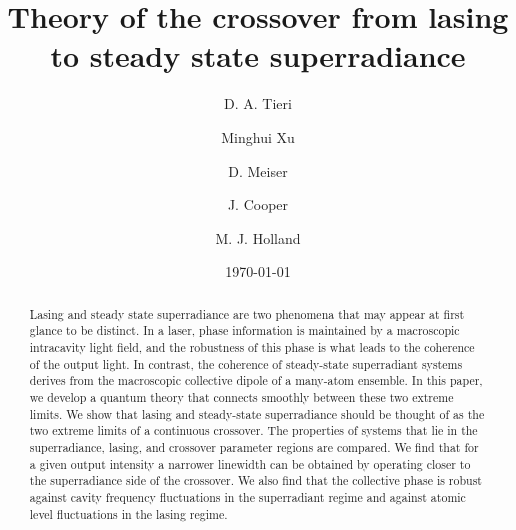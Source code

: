 \documentclass[aps,
twocolumn,
showpacs,
superscriptaddress,groupedaddress]{revtex4}
\begin{document}
\title{Theory of the crossover from lasing to steady state superradiance}

\author{D. A. Tieri} 


\author{Minghui Xu} 


\author{D. Meiser} 



\author{J. Cooper}


\author{M. J. Holland} 


\date{\today}

\begin{abstract}
  Lasing and steady state superradiance are two phenomena that may
  appear at first glance to be distinct.  In a laser, phase
  information is maintained by a macroscopic intracavity light field,
  and the robustness of this phase is what leads to the coherence of
  the output light.  In contrast, the coherence of steady-state
  superradiant systems derives from the macroscopic collective dipole
  of a many-atom ensemble.  In this paper, we develop a quantum theory
  that connects smoothly between these two extreme limits.  We show
  that lasing and steady-state superradiance should be thought of as
  the two extreme limits of a continuous crossover. The properties of
  systems that lie in the superradiance, lasing, and crossover
  parameter regions are compared.  We find that for a given output
  intensity a narrower linewidth can be obtained by operating closer
  to the superradiance side of the crossover.  We also find that the
  collective phase is robust against cavity frequency fluctuations in
  the superradiant regime and against atomic level fluctuations in the
  lasing regime.
\end{abstract}
\end{document}
